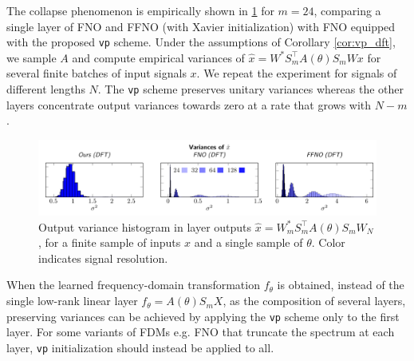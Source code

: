 %
The collapse phenomenon is empirically shown in  \cref{fig:vpfig} for $m=24$, comparing a single layer of FNO and FFNO (with Xavier initialization) with FNO equipped with the proposed {\tt vp} scheme. Under the assumptions of Corollary \ref{cor:vp_dft}, we sample $A$ and compute empirical variances of $\hat x = W^*S_m^\top A(\theta)S_mWx$ for several finite batches of input signals $x$. We repeat the experiment for signals of different lengths $N$. The {\tt vp} scheme preserves unitary variances whereas the other layers concentrate output variances towards zero at a rate that grows with $N - m$.
%
\begin{figure}[H]
    \vspace{-1mm}
    \includegraphics[width=\linewidth]{drawings/vp_hist.pdf}
    \vspace{-8mm}
    \caption{\small Output variance histogram in layer outputs $\hat x = W^*_mS_m^\top A(\theta) S_m W_N$, for a finite sample of inputs $x$ and a single sample of $\theta$. Color indicates signal resolution.}
    \label{fig:vpfig}
\end{figure}
% 
\vspace{-6mm}
When the learned frequency-domain transformation $f_\theta$ is obtained, instead of the single low-rank linear layer $f_\theta = A(\theta) S_m X$, as the composition of several layers, preserving variances can be achieved by applying the {\tt vp} scheme only to the first layer. For some variants of FDMs e.g. FNO that truncate the spectrum at each layer, {\tt vp} initialization should instead be applied to all.

